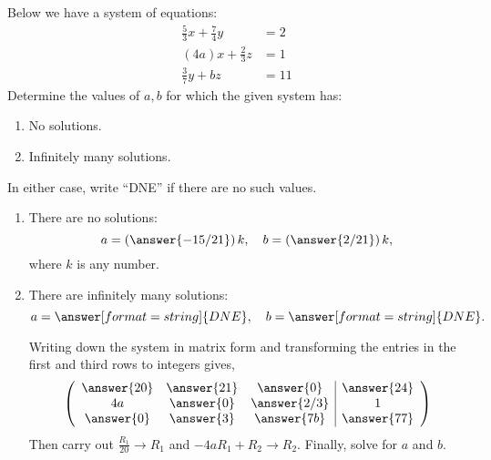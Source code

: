 \documentclass{ximera}
\author{Parisa Fatheddin}
\begin{document}
\begin{exercise}
  Below we have a system of equations:
\begin{align*}
\frac{5}{3}x + \frac{7}{4}y &= 2\\
(4a)x + \frac{2}{3}z &= 1\\
\frac{3}{7} y + bz &= 11
\end{align*}
Determine the values of $a,b$ for which the given system has:
\begin{enumerate}
\item No solutions.
\item Infinitely many solutions.
\end{enumerate}
In either case, write ``DNE'' if there are no such values.
\begin{prompt}
  \begin{enumerate}
  \item  There are no solutions:
    \[
    a = \left(\answer{-15/21}\right)k,\quad  b= \left(\answer{2/21}\right)k,
    \]
    where $k$ is any number.

  \item There are infinitely many solutions:
    \[
    a = \answer[format=string]{DNE},\quad b= \answer[format=string]{DNE}.
    \]
\begin{hint}
Writing down the system in matrix form and transforming the entries in the first and third rows to integers gives,
\[
\left(\begin{array}{ccc|c}
  \answer{20} &  \answer{21} & \answer{0} &\answer{24} \\
  4a &  \answer{0} & \answer{2/3} & 1\\
  \answer{0} &  \answer{3} & \answer{7b} & \answer{77}
\end{array}\right)
\]
Then carry out $\frac{R_{1}}{20} \to R_1$ and
$-4a R_{1} + R_{2} \to R_2$. Finally, solve for $a$ and $b$.
\end{hint}
  \end{enumerate}
\end{prompt}
\end{exercise}
\end{document}
